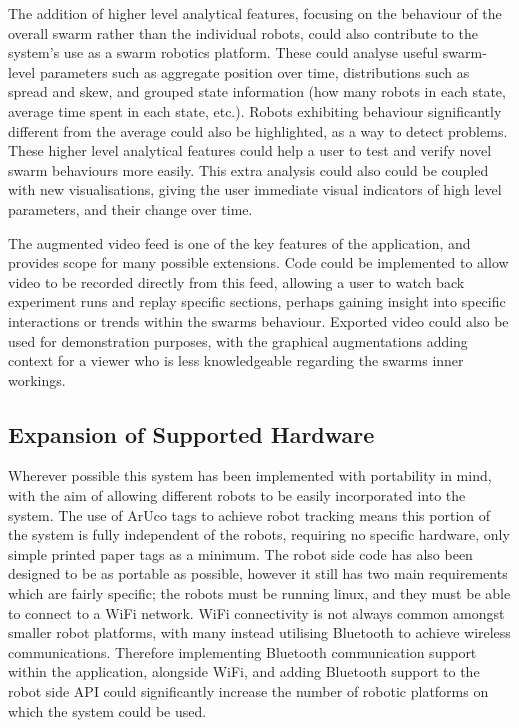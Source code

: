 The addition of higher level analytical features, focusing on the behaviour of the overall swarm rather than the individual robots, could also contribute to the system's use as a swarm robotics platform. These could analyse useful swarm-level parameters such as aggregate position over time, distributions such as spread and skew, and grouped state information (how many robots in each state, average time spent in each state, etc.). Robots exhibiting behaviour significantly different from the average could also be highlighted, as a way to detect problems. These higher level analytical features could help a user to test and verify novel swarm behaviours more easily. This extra analysis could also could be coupled with new visualisations, giving the user immediate visual indicators of high level parameters, and their change over time.

The augmented video feed is one of the key features of the application, and provides scope for many possible extensions. Code could be implemented to allow video to be recorded directly from this feed, allowing a user to watch back experiment runs and replay specific sections, perhaps gaining insight into specific interactions or trends within the swarms behaviour. Exported video could also be used for demonstration purposes, with the graphical augmentations adding context for a viewer who is less knowledgeable regarding the swarms inner workings.


\subsection{Expansion of Supported Hardware} \label{HardwareExpansion}

Wherever possible this system has been implemented with portability in mind, with the aim of allowing different robots to be easily incorporated into the system. The use of ArUco tags to achieve robot tracking means this portion of the system is fully independent of the robots, requiring no specific hardware, only simple printed paper tags as a minimum. The robot side code has also been designed to be as portable as possible, however it still has two main requirements which are fairly specific; the robots must be running linux, and they must be able to connect to a WiFi network. WiFi connectivity is not always common amongst smaller robot platforms, with many instead utilising Bluetooth to achieve wireless communications. Therefore implementing Bluetooth communication support within the application, alongside WiFi, and adding Bluetooth support to the robot side API could significantly increase the number of robotic platforms on which the system could be used.

